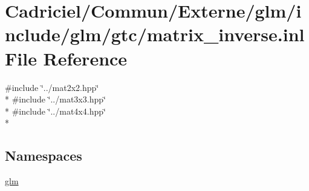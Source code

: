\hypertarget{matrix__inverse_8inl}{}\section{Cadriciel/\+Commun/\+Externe/glm/include/glm/gtc/matrix\+\_\+inverse.inl File Reference}
\label{matrix__inverse_8inl}
{\ttfamily \#include \char`\"{}../mat2x2.\+hpp\char`\"{}}\\*
{\ttfamily \#include \char`\"{}../mat3x3.\+hpp\char`\"{}}\\*
{\ttfamily \#include \char`\"{}../mat4x4.\+hpp\char`\"{}}\\*
\subsection*{Namespaces}
\begin{DoxyCompactItemize}
\item 
 \hyperlink{namespaceglm}{glm}
\end{DoxyCompactItemize}
